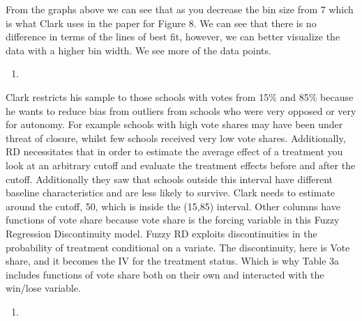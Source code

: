 \documentclass[
  12pt,
  landscape]{article}
\begin{document}
From the graphs above we can see that as you decrease the bin size from
7 which is what Clark uses in the paper for Figure 8. We can see that
there is no difference in terms of the lines of best fit, however, we
can better visualize the data with a higher bin width. We see more of
the data points.

\begin{enumerate}
\def\labelenumi{(\alph{enumi})}
\setcounter{enumi}{2}
\item
\end{enumerate}

Clark restricts his sample to those schools with votes from 15\% and
85\% because he wants to reduce bias from outliers from schools who were
very opposed or very for autonomy. For example schools with high vote
shares may have been under threat of closure, whilst few schools
received very low vote shares. Additionally, RD necessitates that in
order to estimate the average effect of a treatment you look at an
arbitrary cutoff and evaluate the treatment effects before and after the
cutoff. Additionally they saw that schools outside this interval have
different baseline characteristics and are less likely to survive. Clark
needs to estimate around the cutoff, 50, which is inside the (15,85)
interval. Other columns have functions of vote share because vote share
is the forcing variable in this Fuzzy Regression Discontinuity model.
Fuzzy RD exploits discontinuities in the probability of treatment
conditional on a variate. The discontinuity, here is Vote share, and it
becomes the IV for the treatment status. Which is why Table 3a includes
functions of vote share both on their own and interacted with the
win/lose variable.

\begin{enumerate}
\def\labelenumi{(\alph{enumi})}
\setcounter{enumi}{3}
\item
\end{enumerate}
\end{document}
